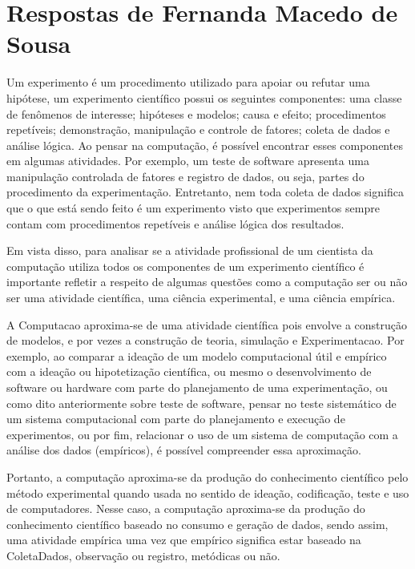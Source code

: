 \section{Respostas de Fernanda Macedo de Sousa\label{tarefa-fernandams-componentes-eperimento}}

Um \gls{experimento} é um procedimento utilizado para apoiar ou refutar uma hipótese, um experimento científico possui os seguintes componentes: uma classe de fenômenos de interesse; hipóteses e modelos; causa e efeito; procedimentos repetíveis; demonstração, manipulação e controle de fatores; coleta de dados e análise lógica. Ao pensar na computação, é possível encontrar esses componentes em algumas atividades. Por exemplo, um teste de software apresenta uma manipulação controlada de fatores e registro de dados, ou seja, partes do procedimento da experimentação. Entretanto, nem toda coleta de dados significa que o que está sendo feito é um experimento visto que experimentos sempre contam com procedimentos repetíveis e análise lógica dos resultados.

Em vista disso, para analisar se a atividade profissional de um cientista da computação utiliza todos os componentes de um experimento científico é importante refletir a respeito de algumas questões como a computação ser ou não ser uma atividade científica, uma ciência experimental, e uma ciência empírica.

A \gls{Computacao} aproxima-se de uma atividade científica pois envolve a construção de modelos, e por vezes a construção de teoria, simulação e \gls{Experimentacao}. Por exemplo, ao comparar a ideação de um modelo computacional útil e empírico com a ideação ou hipotetização científica, ou mesmo o desenvolvimento de software ou hardware com parte do planejamento de uma experimentação, ou como dito anteriormente sobre teste de software, pensar no teste sistemático de um sistema computacional com parte do planejamento e execução de experimentos, ou por fim, relacionar o uso de um sistema de computação com a análise dos dados (empíricos), é possível compreender essa aproximação.

Portanto, a computação aproxima-se da produção do conhecimento científico pelo método experimental quando usada no sentido de ideação, codificação, teste e uso de computadores.  Nesse caso, a computação aproxima-se da produção do conhecimento científico baseado no consumo e geração de dados, sendo assim, uma atividade empírica uma vez que empírico significa estar baseado na \gls{ColetaDados}, observação ou registro, metódicas ou não.